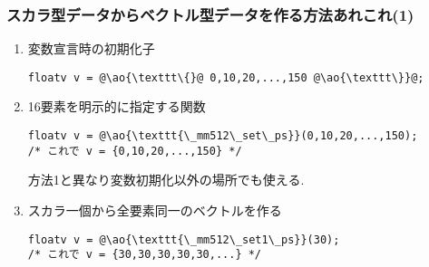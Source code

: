 \documentclass[10pt,dvipdfmx]{beamer}
\newcommand{\ao}[1]{{\color{blue}#1}}
\begin{document}
\begin{frame}[fragile]
\frametitle{スカラ型データからベクトル型データを作る方法あれこれ(1)}
\begin{enumerate}
\item 変数宣言時の初期化子
\begin{lstlisting}
floatv v = @\ao{\texttt\{}@ 0,10,20,...,150 @\ao{\texttt\}}@;
\end{lstlisting}

\item 16要素を明示的に指定する関数
\begin{lstlisting}
floatv v = @\ao{\texttt{\_mm512\_set\_ps}}(0,10,20,...,150);
/* これで v = {0,10,20,...,150} */
\end{lstlisting}
方法1と異なり変数初期化以外の場所でも使える.

\item スカラ一個から全要素同一のベクトルを作る
\begin{lstlisting}
floatv v = @\ao{\texttt{\_mm512\_set1\_ps}}(30);
/* これで v = {30,30,30,30,30,...} */
\end{lstlisting}
\end{enumerate}
\end{frame}

\iffalse
\begin{frame}[fragile]
\frametitle{スカラ型データからベクトル型データを作る方法あれこれ(2)}
\begin{enumerate}
   \setcounter{enumi}{3}
 \item スカラ型の配列から連続8要素をロードする
\begin{lstlisting}
float * a;
     ...
floatv v = @\ao{\texttt{*}}@((floatv *)(&a[i]));
/* これで v = {a[i],a[i+1], ...,a[i+7]} */     
\end{lstlisting}

\item 同じことを関数で
\begin{lstlisting}
float * a;
     ...
floatv v = @\ao{\texttt{\_mm256\_load\_ps}}@(&a[i]);
floatv v = @\ao{\texttt{\_mm256\_loadu\_ps}}@(&a[i]);
/* これで v = {a[i],a[i+1], ...,a[i+7]} */     
\end{lstlisting}
\end{enumerate}
\end{frame}
\fi
\end{document}

